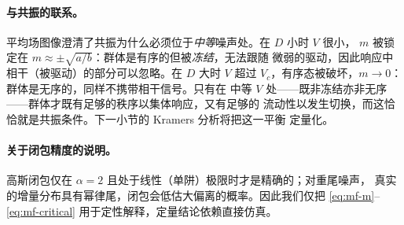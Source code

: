 \paragraph{与共振的联系。}
平均场图像澄清了共振为什么必须位于\emph{中等}噪声处。在 $D$ 小时 $V$ 很小，
$m$ 被锁定在 $m\approx\pm\sqrt{a/b}$：群体是有序的但被\emph{冻结}，无法跟随
微弱的驱动，因此响应中相干（被驱动）的部分可以忽略。在 $D$ 大时 $V$ 超过
$V_c$，有序态被破坏，$m\to0$：群体是无序的，同样不携带相干信号。只有在
中等 $V$ 处——既非冻结亦非无序——群体才既有足够的秩序以集体响应，又有足够的
流动性以发生切换，而这恰恰就是共振条件。下一小节的 Kramers 分析将把这一平衡
定量化。

\paragraph{关于闭包精度的说明。}
高斯闭包仅在 $\alpha=2$ 且处于线性（单阱）极限时才是精确的；对重尾噪声，
真实的增量分布具有幂律尾，闭包会低估大偏离的概率。因此我们仅把
\eqref{eq:mf-m}--\eqref{eq:mf-critical} 用于定性解释，定量结论依赖直接仿真。

